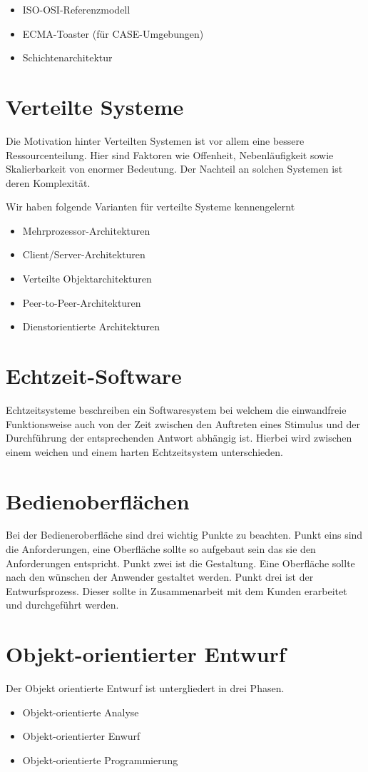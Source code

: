 \begin{itemize}
\item ISO-OSI-Referenzmodell
\item ECMA-Toaster (für CASE-Umgebungen)
\item Schichtenarchitektur 
\end{itemize}

\section{Verteilte Systeme}
Die Motivation hinter Verteilten Systemen ist vor allem eine bessere Ressourcenteilung. Hier sind Faktoren wie Offenheit, Nebenläufigkeit sowie Skalierbarkeit von enormer Bedeutung. Der Nachteil an solchen Systemen ist deren Komplexität.

Wir haben folgende Varianten für verteilte Systeme kennengelernt
\begin{itemize}
\item Mehrprozessor-Architekturen
\item Client/Server-Architekturen
\item Verteilte Objektarchitekturen
\item Peer-to-Peer-Architekturen
\item Dienstorientierte Architekturen
\end{itemize}

\section{Echtzeit-Software}
Echtzeitsysteme beschreiben ein Softwaresystem bei welchem die einwandfreie Funktionsweise auch von der Zeit zwischen den Auftreten eines Stimulus und der Durchführung der entsprechenden Antwort abhängig ist. Hierbei wird zwischen einem weichen und einem harten Echtzeitsystem unterschieden.

\section{Bedienoberflächen}
Bei der Bedieneroberfläche sind drei wichtig Punkte zu beachten. Punkt eins sind die Anforderungen, eine Oberfläche sollte so aufgebaut sein das sie den Anforderungen entspricht. Punkt zwei ist die Gestaltung. Eine Oberfläche sollte nach den wünschen der Anwender gestaltet werden. Punkt drei ist der Entwurfsprozess. Dieser sollte in Zusammenarbeit mit dem Kunden erarbeitet und durchgeführt werden.

\section{Objekt-orientierter Entwurf}
Der Objekt orientierte Entwurf ist untergliedert in drei Phasen.
\begin{itemize}
\item Objekt-orientierte Analyse
\item Objekt-orientierter Enwurf
\item Objekt-orientierte Programmierung
\end{itemize}

